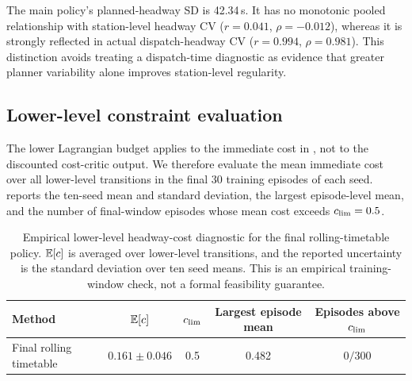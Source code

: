 The main policy's planned-headway SD is 42.34\,s. It has no monotonic pooled relationship with station-level headway CV ($r=0.041$, $\rho=-0.012$), whereas it is strongly reflected in actual dispatch-headway CV ($r=0.994$, $\rho=0.981$). This distinction avoids treating a dispatch-time diagnostic as evidence that greater planner variability alone improves station-level regularity.

\subsection{Lower-level constraint evaluation}
\label{sec:constraint_eval}

The lower Lagrangian budget applies to the immediate cost in , not to the discounted cost-critic output. We therefore evaluate the mean immediate cost over all lower-level transitions in the final 30 training episodes of each seed.  reports the ten-seed mean and standard deviation, the largest episode-level mean, and the number of final-window episodes whose mean cost exceeds $c_{\mathrm{lim}}=0.5$.

\begin{table}[H]
\centering
\caption{Empirical lower-level headway-cost diagnostic for the final rolling-timetable policy. $\mathbb{E}[c]$ is averaged over lower-level transitions, and the reported uncertainty is the standard deviation over ten seed means. This is an empirical training-window check, not a formal feasibility guarantee.}
\label{tab:constraint_cost}
\small
\begin{tabular}{@{}lcccc@{}}
\toprule
Method & $\mathbb{E}[c]$ & $c_{\mathrm{lim}}$ & Largest episode mean & Episodes above $c_{\mathrm{lim}}$ \\
\midrule
Final rolling timetable & $0.161 \pm 0.046$ & 0.5 & 0.482 & $0/300$ \\
\bottomrule
\end{tabular}
\end{table}
